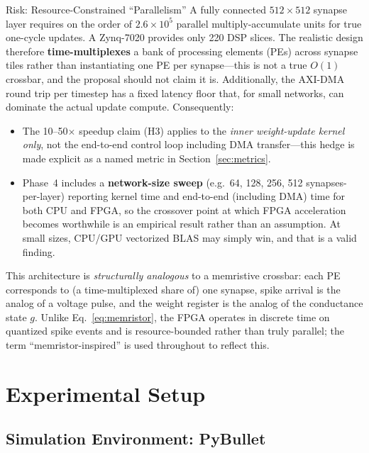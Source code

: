 \documentclass[11pt,a4paper]{article}
\begin{document}
\begin{riskbox}{Risk: Resource-Constrained ``Parallelism''}
A fully connected $512\times512$ synapse layer requires on the order of $2.6\times10^5$
parallel multiply-accumulate units for true one-cycle updates. A Zynq-7020 provides
only 220 DSP slices. The realistic design therefore \textbf{time-multiplexes} a bank
of processing elements (PEs) across synapse tiles rather than instantiating one PE per
synapse---this is not a true $O(1)$ crossbar, and the proposal should not claim it is.
Additionally, the AXI-DMA round trip per timestep has a fixed latency floor that, for
small networks, can dominate the actual update compute. Consequently:
\begin{itemize}[leftmargin=*, itemsep=1pt]
  \item The 10--50$\times$ speedup claim (H3) applies to the \emph{inner
        weight-update kernel only}, not the end-to-end control loop including DMA
        transfer---this hedge is made explicit as a named metric in
        Section~\ref{sec:metrics}.
  \item Phase~4 includes a \textbf{network-size sweep} (e.g.\ 64, 128, 256, 512
        synapses-per-layer) reporting kernel time and end-to-end (including DMA)
        time for both CPU and FPGA, so the crossover point at which FPGA acceleration
        becomes worthwhile is an empirical result rather than an assumption. At small
        sizes, CPU/GPU vectorized BLAS may simply win, and that is a valid finding.
\end{itemize}
\end{riskbox}

This architecture is \emph{structurally analogous} to a memristive crossbar: each PE
corresponds to (a time-multiplexed share of) one synapse, spike arrival is the
analog of a voltage pulse, and the weight register is the analog of the conductance
state $g$. Unlike Eq.~\eqref{eq:memristor}, the FPGA operates in discrete time on
quantized spike events and is resource-bounded rather than truly parallel; the term
``memristor-inspired'' is used throughout to reflect this.

\section{Experimental Setup}

\subsection{Simulation Environment: PyBullet}
\end{document}
